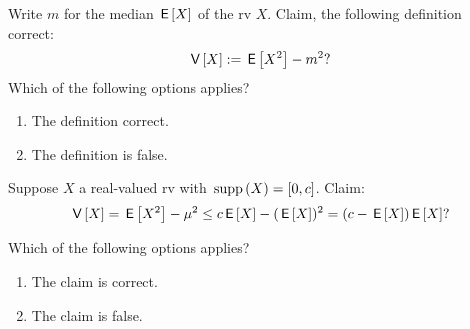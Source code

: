 \documentclass[poll_tutorial_format]{subfiles}
\begin{document}
\begin{exercise}
Write $m$ for the median $\,\mathsf{E}\left[X\right]$ of the rv $X$. Claim, the following definition correct:
\begin{equation}
\label{eq:1}
\,\mathsf{V}\left[X\right] := \,\mathsf{E}\left[X^2\right] - m^{2}?
\end{equation}
\vspace{0.5cm}\noindent  Which of the following options applies?
\begin{enumerate}
\item The definition correct.
\item The definition is false.
\end{enumerate}
\end{exercise}

\begin{exercise}
Suppose $X$ a real-valued rv with $\,\mathrm{supp}\left(X\right) = [0, c]$. Claim:
\begin{equation}
\label{eq:3}
\,\mathsf{V}\left[X\right] = \,\mathsf{E}\left[X^2\right] - \mu^2 \leq c \,\mathsf{E}\left[X\right] - (\,\mathsf{E}\left[X\right])^2 = (c-\,\mathsf{E}\left[X\right])\,\mathsf{E}\left[X\right]?
\end{equation}

\vspace{0.5cm}\noindent  Which of the following options applies?
\begin{enumerate}
\item The claim is correct.
\item The claim is false.
\end{enumerate}
\end{exercise}
\end{document}

